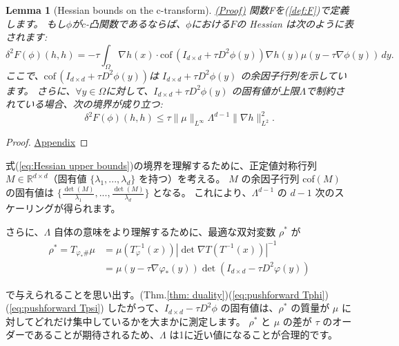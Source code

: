 \documentclass{jsarticle}
\newtheorem{lem}{Lemma}[section]
\theoremstyle{definition}
\begin{document}
\begin{lem}[Hessian bounds on the c-transform]
    \label{lem:Hessian bounds on the c-transform}
    \hyperlink{proof:lem:Hessian bounds on the c-transform}{(Proof)}
    関数Fを(\ref{def:F})で定義します。
    もし$\phi$が$c$-凸関数であるならば、$\phi$における$F$の Hessian は次のように表されます:
    $$
    \delta^2 F(\phi)(h,h) = -\tau \int_\Omega \nabla h(x) \cdot \text{cof}\, (I_{d \times d} + \tau D^2 \phi(y)) \nabla h(y) \mu(y - \tau \nabla \phi(y))\, dy.
    $$
    ここで、$\text{cof}\, (I_{d \times d} + \tau D^2 \phi(y))$は $I_{d \times d} + \tau D^2 \phi(y)$ の余因子行列を示しています。
    さらに、$\forall y \in \Omega$に対して、$I_{d \times d} + \tau D^2 \phi(y)$ の固有値が上限$\Lambda$で制約されている場合、次の境界が成り立つ: 
    {\color{red}
        \begin{equation}
            \label{eq:Hessian upper bounds}
            \delta^2 F(\phi)(h,h) \leq \tau \|\mu\|_{L^\infty} \Lambda^{d-1} \|\nabla h\|_{L^2}^2.
        \end{equation}
    }
    
\end{lem}

\begin{proof}
    \hyperlink{proof:lem:Hessian bounds on the c-transform}{Appendix}
\end{proof}

式(\ref{eq:Hessian upper bounds})の境界を理解するために、正定値対称行列 $M \in \mathbb{R}^{d \times d}$（固有値 $\{\lambda_1,...,\lambda_d\}$ を持つ）を考える。
$M$ の余因子行列 cof$(M)$ の固有値は $\{\frac{\det(M)}{\lambda_1},..., \frac{\det(M)}{\lambda_d}\}$ となる。
これにより、$\Lambda^{d-1}$ の $d-1$ 次のスケーリングが得られます。
{\color{teal}
さらに、$\Lambda$ 自体の意味をより理解するために、最適な双対変数 $\rho^*$ が 
{\color{red}
\begin{align*}
    \rho^* = T_{\varphi_* \#} \mu  &= \mu (T^{-1}_\varphi(x)) |\det \nabla T (T^{-1}(x))|^{-1}\\
    &= \mu(y - \tau \nabla \varphi_*(y)) \det(I_{d \times d} - \tau D^2 \varphi(y))
\end{align*}
}

で与えられることを思い出す。(Thm.\ref{thm: duality})(\ref{eq:pushforward Tphi})(\ref{eq:pushforward Tpsi})
したがって、$I_{d \times d} - \tau D^2 \phi$ の固有値は、$\rho^*$ の質量が $\mu$ に対してどれだけ集中しているかを大まかに測定します。
{\color{red}
$\rho^*$ と $\mu$ の差が $\tau$ のオーダーであることが期待されるため、$\Lambda$ は1に近い値になることが合理的です。
}
}
\end{document}
